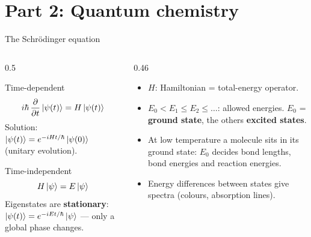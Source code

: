 \documentclass[aspectratio=169,11pt]{beamer}
\newcommand{\key}[1]{{\color{qdark}\textbf{#1}}}
\begin{document}
\section{Part 2: Quantum chemistry}
\begin{frame}{The Schr\"odinger equation}
  \begin{columns}[T]
    \begin{column}{0.5\textwidth}
      \begin{block}{Time-dependent}
        \[ i\hbar\,\frac{\partial}{\partial t}\ket{\psi(t)} = H\ket{\psi(t)} \]
        Solution: $\ket{\psi(t)} = e^{-iHt/\hbar}\ket{\psi(0)}$ (unitary evolution).
      \end{block}
      \begin{block}{Time-independent}
        \[ H\ket{\psi} = E\ket{\psi} \]
        Eigenstates are \key{stationary}: $\ket{\psi(t)} = e^{-iEt/\hbar}\ket{\psi}$ --- only a global phase changes.
      \end{block}
    \end{column}
    \begin{column}{0.46\textwidth}
      \begin{itemize}
        \item $H$: Hamiltonian = total-energy operator.
        \item $E_0 < E_1 \le E_2 \le \dots$: allowed energies. $E_0$ = \key{ground state}, the others \key{excited states}.
        \item At low temperature a molecule sits in its ground state: $E_0$ decides bond lengths, bond energies and reaction energies.
        \item Energy differences between states give spectra (colours, absorption lines).
      \end{itemize}
    \end{column}
  \end{columns}
\end{frame}
\end{document}
